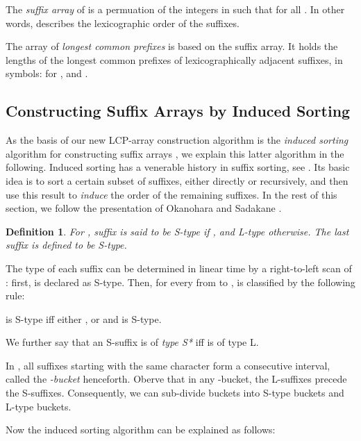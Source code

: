 \documentclass[11pt,onecolumn,final]{article} \usepackage[latin1]{inputenc}
\theoremstyle{plain}
\newtheorem{definition}{Definition}
\theoremstyle{remark}
\begin{document}
The \emph{suffix array}  of  is a permuation of the integers in  such that  for all . In other words,  describes the lexicographic order of the suffixes. 

The array  of \emph{longest common prefixes} is based on the suffix array. It holds the lengths of the longest common prefixes of lexicographically adjacent suffixes, in symbols:  for , and . 

\subsection{Constructing Suffix Arrays by Induced Sorting}
\label{sect:inducing_sa}
As the basis of our new LCP-array construction algorithm is the \emph{induced sorting} algorithm for constructing suffix arrays \cite{nong09linear}, we explain this latter algorithm in the following. Induced sorting has a venerable history in suffix sorting, see \cite{itoh99efficient, seward00performance, ko05space}. Its basic idea is to sort a certain subset of suffixes, either directly or recursively, and then use this result to \emph{induce} the order of the remaining suffixes. In the rest of this section, we follow the presentation of Okanohara and Sadakane \cite{okanohara09linear}.

\begin{definition}
  For , suffix  is said to be \emph{S-type} if , and \emph{L-type} otherwise. The last suffix is defined to be S-type.
\end{definition}

The type of each suffix can be determined in linear time by a right-to-left scan of : first,  is declared as S-type. Then, for every  from  to ,  is classified by the following rule:
\vspace{-5ex}
\begin{center}
\item  is S-type iff either , or  and  is S-type.
\end{center}

We further say that an S-suffix  is of \emph{type S*} iff  is of type L.

In , all suffixes starting with the same character  form a consecutive interval, called the \emph{-bucket} henceforth. Oberve that in any -bucket, the L-suffixes precede the S-suffixes. Consequently, we can sub-divide buckets into S-type buckets and L-type buckets.

Now the induced sorting algorithm can be explained as follows:
\end{document}
